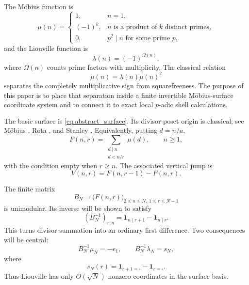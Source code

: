 \documentclass[11pt]{amsart}
\numberwithin{equation}{section}
\theoremstyle{plain}
\theoremstyle{definition}
\theoremstyle{remark}
\newcommand{\one}{\mathbf 1}
\newcommand{\mob}{\mu}
\newcommand{\liou}{\lambda}
\newcommand{\Fsurf}{F}
\newcommand{\Vjump}{V}
\begin{document}
The Möbius function is
\begin{equation}
\mob(n)=
\begin{cases}
1,&n=1,\\
(-1)^k,&n \text{ is a product of }k\text{ distinct primes},\\
0,&p^2\mid n\text{ for some prime }p,
\end{cases}
\label{eq:mobius_definition}
\end{equation}
and the Liouville function is
\begin{equation}
\liou(n)=(-1)^{\Omega(n)},
\label{eq:liouville_definition}
\end{equation}
where $\Omega(n)$ counts prime factors with multiplicity.  The classical relation
\begin{equation}
\mob(n)=\liou(n)\mob(n)^2
\label{eq:mu_lambda_squarefree}
\end{equation}
separates the completely multiplicative sign from squarefreeness.  The purpose of this paper is to place that separation inside a finite invertible Möbius-surface coordinate system and to connect it to exact local $p$-adic shell calculations.

The basic surface is \eqref{eq:abstract_surface}.  Its divisor-poset origin is classical; see Möbius \cite{Mobius1832}, Rota \cite{Rota1964}, and Stanley \cite{Stanley2012}.  Equivalently, putting $d=n/a$,
\begin{equation}
\Fsurf(n,r)=\sum_{\substack{d\mid n\\d<n/r}}\mob(d),
\qquad n\ge1,
\label{eq:surface_small_divisors}
\end{equation}
with the condition empty when $r\ge n$.  The associated vertical jump is
\begin{equation}
\Vjump(n,r)=\Fsurf(n,r-1)-\Fsurf(n,r).
\label{eq:vertical_jump_definition_intro}
\end{equation}

The finite matrix
\begin{equation}
B_N=\bigl(\Fsurf(n,r)\bigr)_{2\le n\le N,\ 1\le r\le N-1}
\label{eq:BN_intro}
\end{equation}
is unimodular.  Its inverse will be shown to satisfy
\begin{equation}
(B_N^{-1})_{r,n}=\one_{n\mid r+1}-\one_{n\mid r}.
\label{eq:BN_inverse_intro}
\end{equation}
This turns divisor summation into an ordinary first difference.  Two consequences will be central:
\begin{equation}
B_N^{-1}\mob_N=-e_1,
\qquad
B_N^{-1}\liou_N=s_N,
\label{eq:mu_lambda_coordinate_preview}
\end{equation}
where
\begin{equation}
s_N(r)=\one_{r+1=\square}-\one_{r=\square}.
\label{eq:sN_preview}
\end{equation}
Thus Liouville has only $O(\sqrt N)$ nonzero coordinates in the surface basis.
\end{document}
